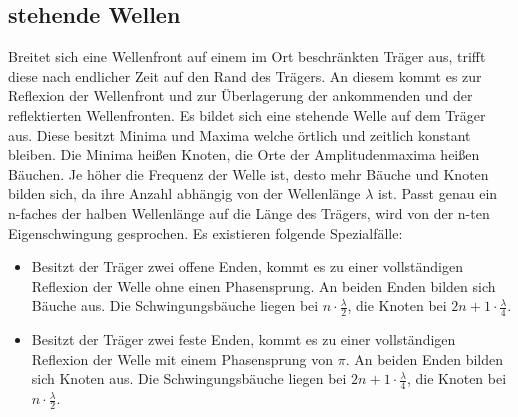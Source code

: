 \subsection{stehende Wellen}
Breitet sich eine Wellenfront auf einem im Ort beschränkten Träger aus, trifft diese
nach endlicher Zeit auf den Rand des Trägers. An diesem kommt es zur Reflexion
 der Wellenfront und zur Überlagerung der ankommenden und der reflektierten
  Wellenfronten. Es bildet sich eine stehende Welle auf dem Träger aus. Diese besitzt
   Minima und Maxima welche örtlich und zeitlich konstant bleiben. Die Minima heißen Knoten,
    die Orte der Amplitudenmaxima heißen Bäuchen. Je höher die Frequenz der
     Welle ist, desto mehr Bäuche und Knoten bilden sich, da ihre Anzahl abhängig
      von der Wellenlänge $\lambda$ ist. Passt genau ein n-faches der halben Wellenlänge
       auf die Länge des Trägers, wird von der n-ten Eigenschwingung gesprochen. Es existieren
    folgende Spezialfälle:
    \begin{itemize}
      \item Besitzt der Träger zwei offene Enden, kommt es zu einer vollständigen
       Reflexion der Welle ohne einen Phasensprung. An beiden Enden bilden sich
        Bäuche aus. Die Schwingungsbäuche liegen bei $n \cdot \frac{\lambda}{2}$,
        die Knoten bei $2n+1 \cdot \frac{\lambda}{4}$.

\item Besitzt der Träger zwei feste Enden, kommt es zu einer vollständigen
 Reflexion der Welle mit einem Phasensprung von $\pi$. An beiden Enden bilden sich Knoten aus.
 Die Schwingungsbäuche liegen bei $2n+1 \cdot \frac{\lambda}{4}$,
 die Knoten bei $n \cdot \frac{\lambda}{2}$.
      \end{itemize}


